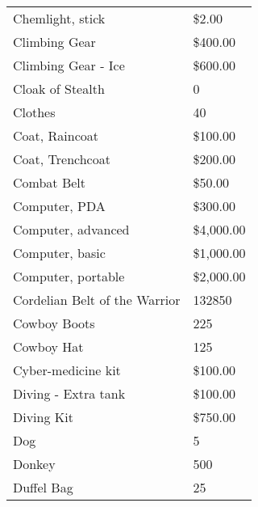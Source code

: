 \documentclass[twoside]{book}
\begin{document}
\begin{longtable}{p{1.25in}l}
  \raggedright
           Chemlight, stick 
  &
   \$2.00 
  \tabularnewline
      
  \raggedright
           Climbing Gear 
  &
   \$400.00 
  \tabularnewline
      
  \raggedright
           Climbing Gear - Ice 
  &
   \$600.00 
  \tabularnewline
      
  \raggedright
           Cloak of Stealth 
  &
   0 
  \tabularnewline
      
  \raggedright
           Clothes 
  &
   40 
  \tabularnewline
      
  \raggedright
           Coat, Raincoat 
  &
   \$100.00 
  \tabularnewline
      
  \raggedright
           Coat, Trenchcoat 
  &
   \$200.00 
  \tabularnewline
      
  \raggedright
           Combat Belt 
  &
   \$50.00 
  \tabularnewline
      
  \raggedright
           Computer, PDA 
  &
   \$300.00 
  \tabularnewline
      
  \raggedright
           Computer, advanced 
  &
   \$4,000.00 
  \tabularnewline
      
  \raggedright
           Computer, basic 
  &
   \$1,000.00 
  \tabularnewline
      
  \raggedright
           Computer, portable 
  &
   \$2,000.00 
  \tabularnewline
      
  \raggedright
           Cordelian Belt of the Warrior
           
  &
   132850 
  \tabularnewline
      
  \raggedright
           Cowboy Boots 
  &
   225 
  \tabularnewline
      
  \raggedright
           Cowboy Hat 
  &
   125 
  \tabularnewline
      
  \raggedright
           Cyber-medicine kit 
  &
   \$100.00 
  \tabularnewline
      
  \raggedright
           Diving - Extra tank 
  &
   \$100.00 
  \tabularnewline
      
  \raggedright
           Diving Kit 
  &
   \$750.00 
  \tabularnewline
      
  \raggedright
           Dog 
  &
   5 
  \tabularnewline
      
  \raggedright
           Donkey 
  &
   500 
  \tabularnewline
      
  \raggedright
           Duffel Bag 
  &
   25 
  \tabularnewline
      

\end{longtable}
\end{document}
